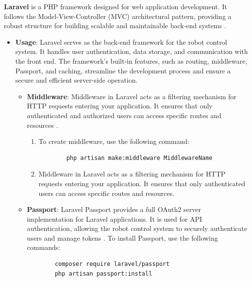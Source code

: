 \textbf{Laravel} is a PHP framework designed for web application development. It follows the Model-View-Controller (MVC) architectural pattern, providing a robust structure for building scalable and maintainable back-end systems \cite{laravel-docs}.
\vspace{-2mm}
\begin{itemize}
    \item \textbf{Usage}: Laravel serves as the back-end framework for the robot control system. It handles user authentication, data storage, and communication with the front end. The framework's built-in features, such as routing, middleware, Passport, and caching, streamline the development process and ensure a secure and efficient server-side operation.

    \vspace{-2mm}
    \begin{itemize}
        \item \textbf{Middleware}: Middleware in Laravel acts as a filtering mechanism for HTTP requests entering your application. It ensures that only authenticated and authorized users can access specific routes and resources \cite{laravel-middleware}.
        \begin{enumerate}
            \item  To create middleware, use the following command:
        \begin{verbatim}
        php artisan make:middleware MiddlewareName
        \end{verbatim}
\vspace{-4mm}
        \item  Middleware in Laravel acts as a filtering mechanism for HTTP requests entering your application. It ensures that only authenticated users can access specific routes and resources.

\newpage
        

        \end{enumerate}

        
        \item \textbf{Passport}: Laravel Passport provides a full OAuth2 server implementation for Laravel applications. It is used for API authentication, allowing the robot control system to securely authenticate users and manage tokens \cite{laravel-passport}. To install Passport, use the following commands:
        \begin{verbatim}
        composer require laravel/passport
        php artisan passport:install
        \end{verbatim}


\end{itemize}
\end{itemize}
